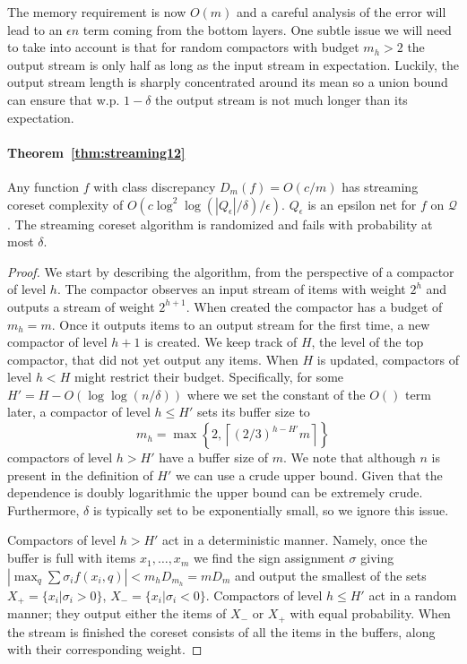 \documentclass[12pt]{colt2019} %
\newcommand{\eps}{\epsilon}
\newcommand{\Q}{\mathcal{Q}}
\newcommand{\ceil}[1]{\left \lceil #1 \right \rceil}
\begin{document}
{The memory requirement is now $O(m)$ and a careful analysis of the error will lead to an $\eps n$ term coming from the bottom layers. One subtle issue we will need to take into account is that for random compactors with budget $m_h>2$ the output stream is only half as long as the input stream in expectation. Luckily, the output stream length is sharply concentrated around its mean so a union bound can ensure that w.p. $1-\delta$ the output stream is not much longer than its expectation.



\paragraph{Theorem~\ref{thm:streaming12}} 
Any function $f$ with class discrepancy $D_m(f) = O(c/m)$ has streaming coreset complexity of $O\left(c\log^2\log(|Q_\eps|/\delta)/\eps\right)$.
$Q_\eps$ is an epsilon net for $f$ on $\Q$. 
The streaming coreset algorithm is randomized and fails with probability at most $\delta$.
\begin{proof}
We start by describing the algorithm, from the perspective of a compactor of level $h$. The compactor observes an input stream of items with weight $2^h$ and outputs a stream of weight $2^{h+1}$. When created the compactor has a budget of $m_h=m$. Once it outputs items to an output stream for the first time, a new compactor of level $h+1$ is created. We keep track of $H$, the level of the top compactor, that did not yet output any items. When $H$ is updated, compactors of level $h<H$ might restrict their budget. Specifically, for some $H'=H-O(\log\log(n/\delta))$ where we set the constant of the $O()$ term later, a compactor of level $h \leq H'$ sets its buffer size to
$$ m_h = \max\left\{2, \ceil{(2/3)^{h-H'}m} \right\} $$
compactors of level $h >H'$ have a buffer size of $m$. We note that although $n$ is present in the definition of $H'$ we can use a crude upper bound. Given that the dependence is doubly logarithmic the upper bound can be extremely crude. Furthermore, $\delta$ is typically set to be exponentially small, so we ignore this issue.

Compactors of level $h >H'$ act in a deterministic manner. Namely, once the buffer is full with items $x_1,\ldots,x_m$ we find the sign assignment $\sigma$ giving $\left|\max_q \sum \sigma_i f(x_i, q)\right| < m_hD_{m_h}=mD_m$ and output the smallest of the sets $X_+=\{x_i | \sigma_i > 0 \}$, $X_- = \{x_i | \sigma_i < 0 \}$. Compactors of level $h \leq H'$ act in a random manner; they output either the items of $X_-$ or $X_+$ with equal probability. When the stream is finished the coreset consists of all the items in the buffers, along with their corresponding weight.


\end{proof}}
\end{document}
